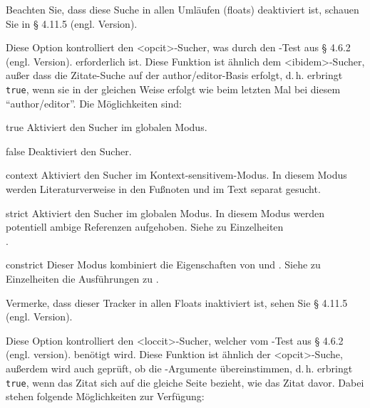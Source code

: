 \documentclass{ltxdockit}[2011/03/25]
\begin{document}
\begin{optionlist}
Beachten Sie, dass diese Suche in allen Umläufen (floats) deaktiviert ist,
schauen Sie in § 4.11.5 (engl. Version). %


Diese Option kontrolliert den <opcit>-Sucher, was durch den -Test
aus § 4.6.2 (engl. Version). %
erforderlich ist. Diese Funktion ist ähnlich dem
<ibidem>-Sucher, außer dass die Zitate-Suche auf der author/editor-Basis
erfolgt, d.\,h.  erbringt \texttt{true}, wenn sie in der gleichen
Weise erfolgt wie beim letzten Mal bei diesem "`author\slash editor"'. Die
Möglichkeiten sind:

\begin{valuelist} 
\item[true] Aktiviert den Sucher im globalen Modus.
\item[false] Deaktiviert den Sucher.  
\item[context] Aktiviert den Sucher im
Kontext-sensitivem-Modus. In diesem Modus werden Literaturverweise in den
Fußnoten und im Text separat gesucht.  
\item[strict] Aktiviert den Sucher im
globalen Modus. In diesem Modus werden potentiell ambige Referenzen
aufgehoben. Siehe zu Einzelheiten \\
.  
\item[constrict]
Dieser Modus kombiniert die Eigenschaften von  und .
Siehe zu Einzelheiten die Ausführungen zu .
\end{valuelist}

Vermerke, dass dieser Tracker in allen Floats inaktiviert ist, sehen Sie
§ 4.11.5 (engl. Version). %


Diese Option kontrolliert den <loccit>-Sucher, welcher vom -Test
aus § 4.6.2 (engl. version). %
benötigt wird. Diese Funktion ist ähnlich der
<opcit>-Suche, außerdem wird auch geprüft, ob die -Argumente
übereinstimmen, d.\,h.  erbringt \texttt{true}, wenn das
Zitat sich auf die gleiche Seite bezieht, wie das Zitat davor. Dabei stehen 
folgende Möglichkeiten zur Verfügung:


\end{optionlist}
\end{document}
